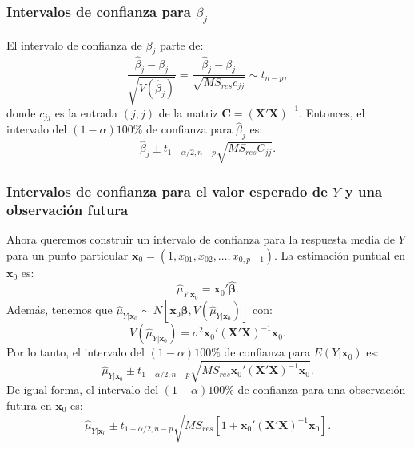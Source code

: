 \documentclass[
]{article}
\begin{document}
\hypertarget{intervalos-de-confianza-para-beta_j}{%
\subsubsection{\texorpdfstring{Intervalos de confianza para \(\beta_{j}\)}{Intervalos de confianza para \textbackslash beta\_\{j\}}}\label{intervalos-de-confianza-para-beta_j}}

El intervalo de confianza de \(\beta_{j}\) parte de:
\[
\frac{\widehat{\beta}_{j} - \beta_{j}}{\sqrt{V(\widehat{\beta}_{j})}} =  \frac{\widehat{\beta}_{j} - \beta_{j}}{\sqrt{MS_{res}c_{jj}}} \sim t_{n-p},
\]
donde \(c_{jj}\) es la entrada \((j,j)\) de la matriz \(\boldsymbol C=(\boldsymbol X'\boldsymbol X)^{-1}\). Entonces, el intervalo del \((1-\alpha)100\%\) de confianza para \(\widehat{\beta}_{j}\) es:
\[
\widehat{\beta}_{j} \pm t_{1-\alpha/2,n-p}\sqrt{MS_{res}C_{jj}}.
\]

\hypertarget{intervalos-de-confianza-para-el-valor-esperado-de-y-y-una-observaciuxf3n-futura}{%
\subsubsection{\texorpdfstring{Intervalos de confianza para el valor esperado de \(Y\) y una observación futura}{Intervalos de confianza para el valor esperado de Y y una observación futura}}\label{intervalos-de-confianza-para-el-valor-esperado-de-y-y-una-observaciuxf3n-futura}}

Ahora queremos construir un intervalo de confianza para la respuesta media de \(Y\) para un punto particular \(\boldsymbol x_{0}=(1,x_{01},x_{02},\ldots,x_{0,p-1})\). La estimación puntual en \(\boldsymbol x_{0}\) es:
\[
\widehat{\mu}_{Y|\boldsymbol x_0} = \boldsymbol x_{0}'\widehat{\boldsymbol \beta}.
\]
Además, tenemos que \(\widehat{\mu}_{Y|\boldsymbol x_0} \sim N[\boldsymbol x_{0}\boldsymbol \beta, V(\widehat{\mu}_{Y|\boldsymbol x_0})]\) con:
\[
V(\widehat{\mu}_{Y|\boldsymbol x_0}) = \sigma^{2}\boldsymbol x_{0}'(\boldsymbol X'\boldsymbol X)^{-1}\boldsymbol x_{0}.
\]
Por lo tanto, el intervalo del \((1-\alpha)100\%\) de confianza para \(E(Y|\boldsymbol x_{0})\) es:
\[
\widehat{\mu}_{Y|\boldsymbol x_0} \pm t_{1-\alpha/2,n-p}\sqrt{MS_{res}\boldsymbol x_{0}'(\boldsymbol X'\boldsymbol X)^{-1}\boldsymbol x_{0}}.
\]
De igual forma, el intervalo del \((1-\alpha)100\%\) de confianza para una observación futura en \(\boldsymbol x_{0}\) es:
\[
\widehat{\mu}_{Y|\boldsymbol x_0} \pm t_{1-\alpha/2,n-p}\sqrt{MS_{res}\left[1+ \boldsymbol x_{0}'(\boldsymbol X'\boldsymbol X)^{-1}\boldsymbol x_{0}\right]}.
\]
\end{document}
